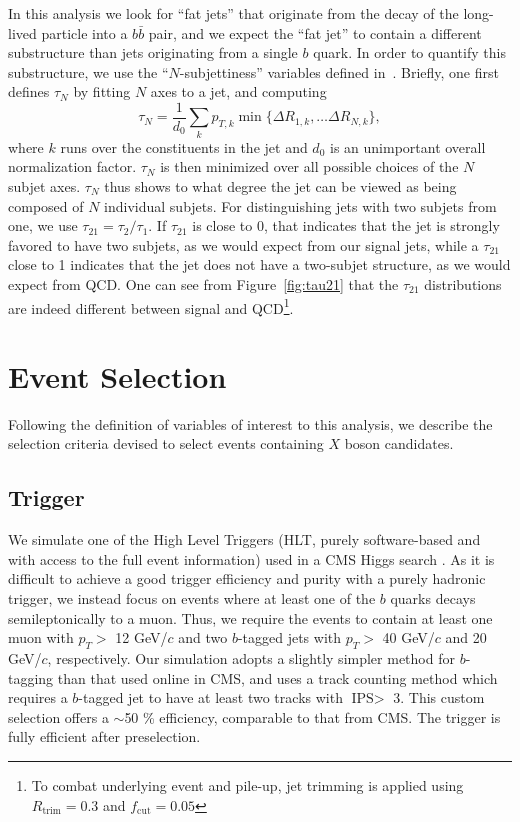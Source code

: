 \documentclass{JHEP3}
\newcommand{\IPS}{\textrm{IPS}}
\begin{document}
In this analysis we look for ``fat jets'' that originate from the decay of the long-lived particle into a
$b\bar{b}$ pair, and we expect the ``fat jet'' to contain a different substructure than jets originating from
a single $b$ quark. In order to quantify this substructure, we use the ``$N$-subjettiness'' variables defined
in~\cite{Thaler:2010tr,Thaler:2011gf}. Briefly, one first defines $\tau_N$ by fitting $N$ axes to a jet, and
computing
\begin{equation}
\tau_N = \frac{1}{d_0}\sum_{k}p_{T,k} \min\{\Delta R_{1,k}, \ldots \Delta R_{N,k}\},
\end{equation}
where $k$ runs over the constituents in the jet and $d_0$ is an unimportant
overall normalization factor. $\tau_N$ is then minimized over all possible choices of
the $N$ subjet axes. $\tau_N$ thus shows to what degree the jet can be viewed as being composed of $N$ individual
subjets. For distinguishing jets with two subjets from one, we use $\tau_{21} = \tau_2 / \tau_1$. If
$\tau_{21}$ is close to 0, that indicates that the jet is strongly favored to have two subjets, as we would
expect from our signal jets, while a $\tau_{21}$ close to 1 indicates that the jet does not have a two-subjet
structure, as we would expect from QCD. One can see from Figure~\ref{fig:tau21} that the $\tau_{21}$
distributions are indeed different between signal and QCD\footnote{To combat underlying event and pile-up, jet trimming is applied using $R_{\textrm{trim}}=0.3$ and $f_{\textrm{cut}}=0.05$}.


\section{Event Selection}
\label{sec:selection}

Following the definition of variables of interest to this analysis, we describe the selection criteria devised
to select events containing $X$ boson candidates.

\subsection{Trigger}

We simulate one of the High Level Triggers (HLT, purely software-based and with access to the full event
information) used in a CMS Higgs search \cite{Chatrchyan:2013qga}.  As it is difficult to achieve a good
trigger efficiency and purity with a purely hadronic trigger, we instead focus on events where at least
one of the $b$ quarks decays semileptonically to a muon. Thus, we require the events to contain at least one
muon with $p_{T}>$ 12 GeV/$c$ and two $b$-tagged jets with $p_{T} >$ 40 GeV/$c$ and 20 GeV/$c$, respectively. Our
simulation adopts a slightly simpler method for $b$-tagging than that used online in CMS, and uses a
track counting method \cite{Chatrchyan:2012jua} which requires a $b$-tagged jet to have at least two
tracks with $\IPS >$ 3. This custom selection offers a $\sim$50 \% efficiency, comparable to that from CMS. The trigger is fully efficient after preselection.
\end{document}

